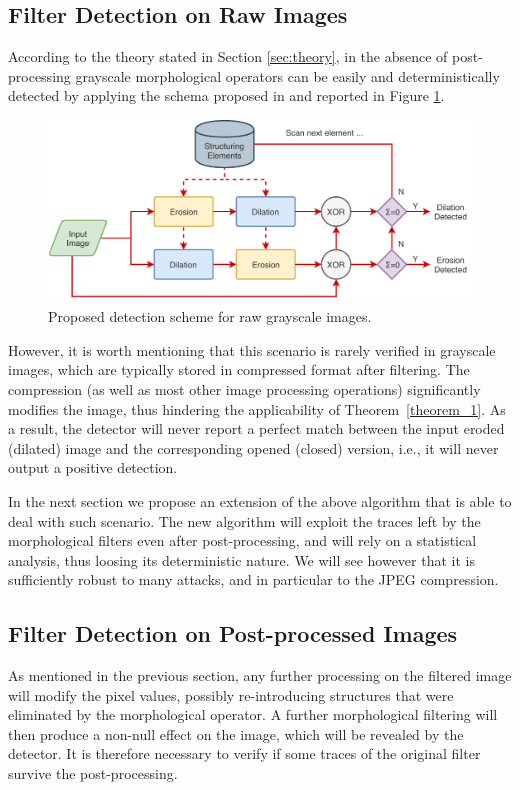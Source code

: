 \documentclass{ieeeaccess}
\begin{document}
\subsection{Filter Detection on Raw Images}

According to the theory stated in Section \ref{sec:theory}, in the absence of post-processing grayscale morphological operators can be easily and deterministically detected by applying the schema proposed in \cite{de2017detecting} and reported in Figure \ref{fig:scheme}.

\begin{figure}[!ht]
	\centering
	\includegraphics[width=0.7\linewidth]{diagram1}
	\caption{Proposed detection scheme for raw grayscale images.}
	\label{fig:scheme}
\end{figure}

However, it is worth mentioning that this scenario is rarely verified in grayscale images, which are typically stored in compressed format after filtering. The compression (as well as most other image processing operations) significantly modifies the image, thus hindering the applicability of Theorem~\ref{theorem_1}. As a result, the detector will never report a perfect match between the input eroded (dilated) image and the corresponding opened (closed) version, i.e., it will never output a positive detection.

In the next section we propose an extension of the above algorithm that is able to deal with such scenario. The new algorithm will exploit the traces left by the morphological filters even after post-processing, and will rely on a statistical analysis, thus loosing its deterministic nature. We will see however that it is sufficiently robust to many attacks, and in particular to the JPEG compression.

\subsection{Filter Detection on Post-processed Images}
As mentioned in the previous section, any further processing on the filtered image will modify the pixel values, possibly re-introducing structures that were eliminated by the morphological operator. A further morphological filtering will then produce a non-null effect on the image, which will be revealed by the detector. It is therefore necessary to verify if some traces of the original filter survive the post-processing.
\end{document}
